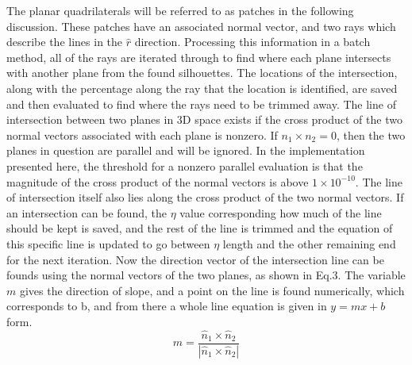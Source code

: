 The planar quadrilaterals will be referred to as patches in the following discussion. These patches have an associated normal vector, and two rays which describe the lines in the $\hat{r}$ direction. Processing this information in a batch method, all of the rays are iterated through to find where each plane intersects with another plane from the found silhouettes. The locations of the intersection, along with the percentage along the ray that the location is identified, are saved and then evaluated to find where the rays need to be trimmed away. The line of intersection between two planes in 3D space exists if the cross product of the two normal vectors associated with each plane is nonzero. If $n_1 \times n_2 = 0$, then the two planes in question are parallel and will be ignored. In the implementation presented here, the threshold for a nonzero parallel evaluation is that the magnitude of the cross product of the normal vectors is above $1\times 10^{-10}$. The line of intersection itself also lies along the cross product of the two normal vectors. If an intersection can be found, the $\eta$ value corresponding how much of the line should be kept is saved, and the rest of the line is trimmed and the equation of this specific line is updated to go between $\eta$ length and the other remaining end for the next iteration. Now the direction vector of the intersection line can be founds using the normal vectors of the two planes, as shown in Eq.3. The variable $m$ gives the direction of slope, and a point on the line is found numerically, which corresponds to b, and from there a whole line equation is given in $y = mx + b$ form. 
\begin{equation}
    m = \frac{\hat{n}_1 \times \hat{n}_2}{|\hat{n}_1 \times \hat{n}_2|}
\end{equation}


